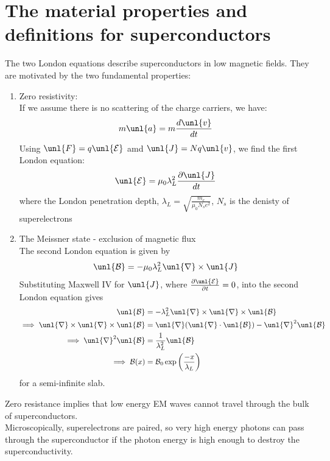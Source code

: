 \documentclass[a4paper, 11pt, normalem]{report}
\newcommand\p{\partial}
\newcommand\E{\mathcal{E}}
\newcommand\uE{\unl{\E}}
\newcommand\B{\mathcal{B}}
\newcommand\uB{\unl{\B}}
\newcommand\del{\unl{\nabla}}
\newcommand\J{\unl{J}}
\newcommand\pen{\lambda_L}
\begin{document}
\section{The material properties and definitions for superconductors}
The two London equations describe superconductors in low magnetic fields.
They are motivated by the two fundamental properties:
\begin{enumerate}
	\item Zero resistivity: \\
	If we assume there is no scattering of the charge carriers, we have:
	\begin{equation*}
		m\unl{a} = m\frac{d\unl{v}}{dt}
	\end{equation*}
	Using $\unl{F} = q\uE$ amd $\J = Nq\unl{v}$, we find the first London equation:
	\begin{equation*}
		\uE = \mu_0\lambda_L^2\frac{\p \J}{dt}
	\end{equation*}
	where the London penetration depth, $\pen = \sqrt{\frac{m_e}{\mu_0N_se^2}}$, $N_s$ is the denisty of superelectrons
	\item The Meissner state - exclusion of magnetic flux \\
	The second London equation is given by
	\begin{equation*}
		\uB = -\mu_0\pen^2\del\times\J
	\end{equation*}
	Substituting Maxwell \RN{4} for $\J$, where $\frac{\p\uE}{\p t} = 0$, into the second London equation gives
	\begin{align*}
		\uB &= -\pen^2\del\times\del\times\uB \\
		\implies \del\times\del\times\uB &= \del(\del\cdot\uB) - \del^2\uB \\
		\implies \del^2\uB &= \frac{1}{\pen^2}\uB \\
		\implies \B(x) &= \B_0\exp\left(\frac{-x}{\pen}\right)
	\end{align*}
	for a semi-infinite slab.
\end{enumerate}
Zero resistance implies that low energy EM waves cannot travel through the bulk of superconductors. \\
Microscopically, superelectrons are paired, so very high energy photons can pass through the superconductor if the photon energy is high enough to destroy the superconductivity.
\end{document}
